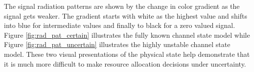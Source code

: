 The signal radiation patterns are shown by the change in color gradient as the signal gets weaker.  The gradient starts with white as the highest value and shifts into blue for intermediate values and finally to black for a zero valued signal.  Figure \ref{fig:rad_pat_certain} illustrates the fully known channel state model while Figure \ref{fig:rad_pat_uncertain} illustrates the highly unstable channel state model.  These two visual presentations of the physical state help demonstrate that it is much more difficult to make resource allocation decisions under uncertainty.

\begin{figure}[ht]
\begin{center}
	\subfigure[]{
}
\end{center}
\end{figure}
